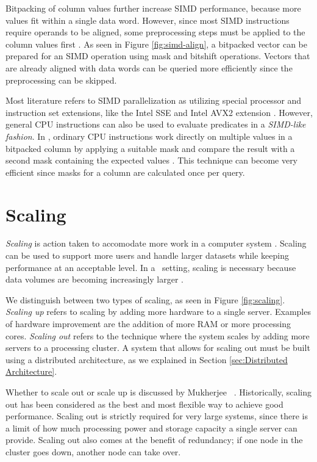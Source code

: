Bitpacking of column values further increase SIMD performance, because more values fit within a single data word. However, since most SIMD instructions require operands to be aligned, some preprocessing steps must be applied to the column values first \cite{Willhalm2009-hu}. As seen in Figure \ref{fig:simd-align}, a bitpacked vector can be prepared for an SIMD operation using mask and bitshift operations. Vectors that are already aligned with data words can be queried more efficiently since the preprocessing can be skipped.

Most literature refers to SIMD parallelization as utilizing special processor and instruction set extensions, like the Intel SSE and Intel AVX2 extension \cite{Willhalm2013-ri, Willhalm2009-hu}. However, general CPU instructions can also be used to evaluate predicates in a \textit{SIMD-like fashion}. In \blink, ordinary CPU instructions work directly on multiple values in a bitpacked column by applying a suitable mask and compare the result with a second mask containing the expected values \cite{Johnson2008-cp}. This technique can become very efficient since masks for a column are calculated once per query.

\section{Scaling}
\label{sec:Scaling}
\textit{Scaling} is action taken to accomodate more work in a computer system \cite{Wikipedia_contributors2015-lw}. Scaling can be used to support more users and handle larger datasets while keeping performance at an acceptable level. In a \bd~setting, scaling is necessary because data volumes are becoming increasingly larger \cite{Qlik2012-ku}.


We distinguish between two types of scaling, as seen in Figure \ref{fig:scaling}. \textit{Scaling up} refers to scaling by adding more hardware to a single server. Examples of hardware improvement are the addition of more RAM or more processing cores. \textit{Scaling out} refers to the technique where the system scales by adding more servers to a processing cluster. A system that allows for scaling out must be built using a distributed architecture, as we explained in Section \ref{sec:Distributed Architecture}.

Whether to scale out or scale up is discussed by Mukherjee \ea~\cite{Mukherjee2015-ul}. Historically, scaling out has been considered as the best and most flexible way to achieve good performance. Scaling out is strictly required for very large systems, since there is a limit of how much processing power and storage capacity a single server can provide. Scaling out also comes at the benefit of redundancy; if one node in the cluster goes down, another node can take over.

